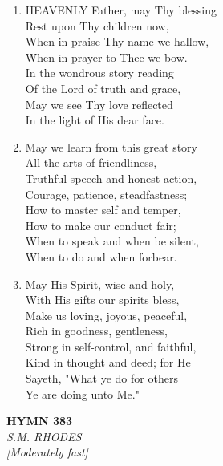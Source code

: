 \documentclass[11pt,a4paper]{article}
\begin{document}
\begin{enumerate}
    \item HEAVENLY Father, may Thy blessing \\
        Rest upon Thy children now, \\
        When in praise Thy name we hallow, \\
        When in prayer to Thee we bow. \\
        In the wondrous story reading \\
        Of the Lord of truth and grace, \\
        May we see Thy love reflected \\
        In the light of His dear face.

    \item May we learn from this great story \\
        All the arts of friendliness, \\
        Truthful speech and honest action, \\
        Courage, patience, steadfastness; \\
        How to master self and temper, \\
        How to make our conduct fair; \\
        When to speak and when be silent, \\
        When to do and when forbear.

    \item May His Spirit, wise and holy, \\
        With His gifts our spirits bless, \\
        Make us loving, joyous, peaceful, \\
        Rich in goodness, gentleness, \\
        Strong in self-control, and faithful, \\
        Kind in thought and deed; for He \\
        Sayeth, "What ye do for others \\
        Ye are doing unto Me."

\end{enumerate}

\newpage
\begin{center}
    {\Large \textbf{HYMN 383}}
    \\
    \textit{S.M. RHODES}
    \\
    \textit{\small [Moderately fast]}
\end{center}
\vspace{1em}
\end{document}
